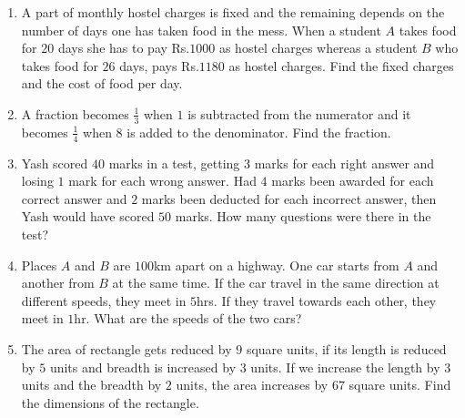 \begin{enumerate}
\begin{enumerate}[label=(\roman*)]
\item A part of monthly hostel charges is fixed and the remaining depends on the number of days one has taken food in the mess. When a student $A$ takes food for $20$ days she has to pay Rs.$1000$ as hostel charges whereas a student $B$ who takes food for $26$ days, pays Rs.$1180$ as hostel charges. Find the fixed charges and the cost of food per day.
\item A fraction becomes $\frac{1}{3}$ when $1$ is subtracted from the numerator and it becomes $\frac{1}{4}$ when $8$ is added to the denominator. Find the fraction.
\item Yash scored $40$ marks in a test, getting $3$ marks for each right answer and losing $1$ mark for each wrong answer. Had $4$ marks been awarded for each correct answer and $2$ marks been deducted for each incorrect answer, then Yash would have scored $50$ marks. How many questions were there in the test?
\item Places $A$ and $B$ are $100$km apart on a highway. One car starts from $A$ and another from $B$ at the same time. If the car travel in the same direction at different speeds, they meet in $5$hrs. If they travel towards each other, they meet in $1$hr. What are the speeds of the two cars?
\item The area of rectangle gets reduced by $9$ square units, if its length is reduced by $5$ units and breadth is increased by $3$ units. If we increase the length by $3$ units and the breadth by $2$ units, the area increases by $67$ square units. Find the dimensions of the rectangle.
\end{enumerate}
\end{enumerate}
